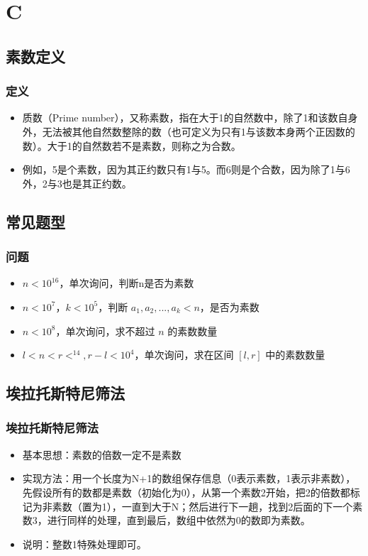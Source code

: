 \documentclass{beamer}
\begin{document}
\section{C}
\subsection{素数定义}
\begin{frame}
\frametitle{定义}
\begin{itemize}
\item 质数（Prime number），又称素数，指在大于1的自然数中，除了1和该数自身外，无法被其他自然数整除的数（也可定义为只有1与该数本身两个正因数的数）。大于1的自然数若不是素数，则称之为合数。
\item 例如，5是个素数，因为其正约数只有1与5。而6则是个合数，因为除了1与6外，2与3也是其正约数。
\end{itemize}
\end{frame}

\subsection{常见题型}
\begin{frame}
\frametitle{问题}
\begin{itemize}
\item $ n<10^{16} $，单次询问，判断n是否为素数
\item  $n<10^7 $，$ k<10^5 $，判断 $ a_1,a_2, ... , a_k < n $，是否为素数
\item  $n<10^{8} $，单次询问，求不超过 $n$ 的素数数量
\item  $l < n < r < ^{14} , r - l < 10^4 $，单次询问，求在区间 $[l, r]$ 中的素数数量
\end{itemize}
\end{frame}

\subsection{埃拉托斯特尼筛法}
\begin{frame}
\frametitle{埃拉托斯特尼筛法}
\begin{itemize}
\item 基本思想：素数的倍数一定不是素数
\item 实现方法：用一个长度为N+1的数组保存信息（0表示素数，1表示非素数），先假设所有的数都是素数（初始化为0），从第一个素数2开始，把2的倍数都标记为非素数（置为1），一直到大于N；然后进行下一趟，找到2后面的下一个素数3，进行同样的处理，直到最后，数组中依然为0的数即为素数。
\item 说明：整数1特殊处理即可。
\end{itemize}
\end{frame}
\end{document}
